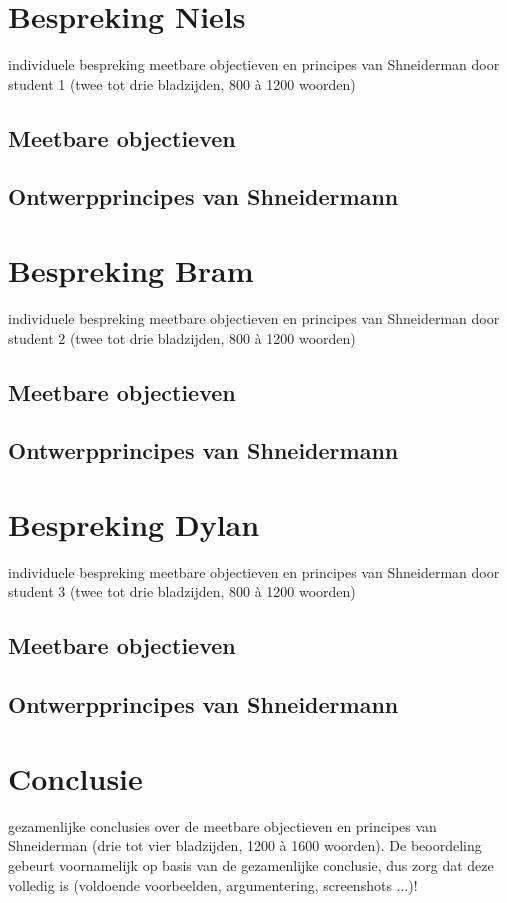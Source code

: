 \documentclass[11pt]{article}
\begin{document}
\section{Bespreking Niels}
individuele bespreking meetbare objectieven en principes van Shneiderman door student 1 (twee tot drie bladzijden, 800 à 1200 woorden)
\subsection{Meetbare objectieven}
\subsection{Ontwerpprincipes van Shneidermann}
\newpage

\section{Bespreking Bram}
individuele bespreking meetbare objectieven en principes van Shneiderman door student 2 (twee tot drie bladzijden, 800 à 1200 woorden)
\subsection{Meetbare objectieven}
\subsection{Ontwerpprincipes van Shneidermann}
\newpage

\section{Bespreking Dylan}
individuele bespreking meetbare objectieven en principes van Shneiderman door student 3 (twee tot drie bladzijden, 800 à 1200 woorden)
\subsection{Meetbare objectieven}
\subsection{Ontwerpprincipes van Shneidermann}
\newpage


\section{Conclusie}
gezamenlijke conclusies over de meetbare objectieven en principes van Shneiderman (drie tot vier bladzijden, 1200 à 1600 woorden). De beoordeling gebeurt voornamelijk op basis van de gezamenlijke conclusie, dus zorg dat deze volledig is (voldoende voorbeelden, argumentering, screenshots ...)!
\newpage
\end{document}
